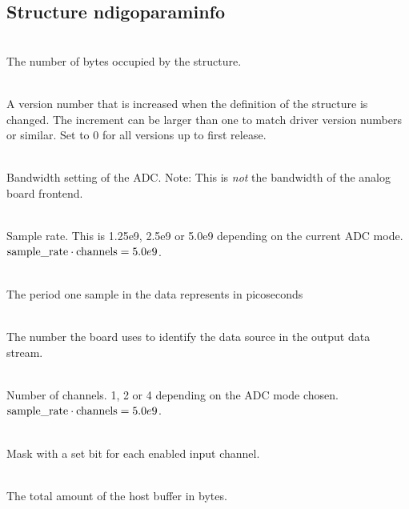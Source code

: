         \subsection{Structure ndigo\tu param\tu info}

            \\
            The number of bytes occupied by the structure.\par

            \\
            A version number that is increased when the definition of the structure is changed. The increment can be larger than one to match driver version numbers or similar. Set to 0 for all versions up to
first release.\par

            \\
            Bandwidth setting of the ADC. Note: This is \emph{not} the bandwidth of the analog board frontend. \par

            \\
            Sample rate. This is 1.25e9, 2.5e9 or 5.0e9 depending on the current ADC mode. $\text{sample\textunderscore rate}\cdot \text{channels} = 5.0e9$.\par

            \\
            The period one sample in the data represents in picoseconds\par

            \\
            The number the board uses to identify the data source in the output data stream.\par

            \\
            Number of channels. 1, 2 or 4 depending on the ADC mode chosen. $\text{sample\textunderscore rate}\cdot\text{channels} = 5.0e9$.\par

            \\
            Mask with a set bit for each enabled input channel.\par

            \\
            The total amount of the host buffer in bytes.\par

